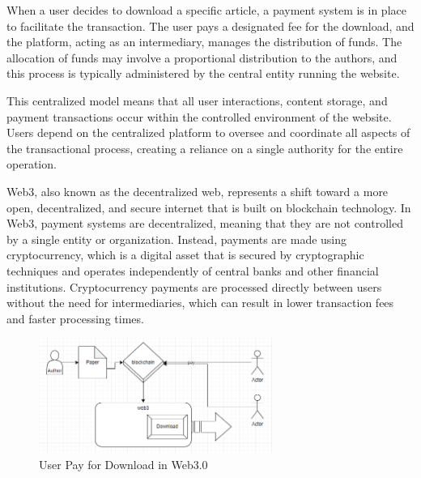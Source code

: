 \documentclass[lettersize,journal]{IEEEtran}
\begin{document}
When a user decides to download a specific article, a payment system is in place to facilitate the transaction. The user pays a designated fee for the download, and the platform, acting as an intermediary, manages the distribution of funds. The allocation of funds may involve a proportional distribution to the authors, and this process is typically administered by the central entity running the website.

This centralized model means that all user interactions, content storage, and payment transactions occur within the controlled environment of the website. Users depend on the centralized platform to oversee and coordinate all aspects of the transactional process, creating a reliance on a single authority for the entire operation.



Web3, also known as the decentralized web, represents a shift toward a more open, decentralized, and secure internet that is built on blockchain technology. In Web3, payment systems are decentralized, meaning that they are not controlled by a single entity or organization. Instead, payments are made using cryptocurrency, which is a digital asset that is secured by cryptographic techniques and operates independently of central banks and other financial institutions. Cryptocurrency payments are processed directly between users without the need for intermediaries, which can result in lower transaction fees and faster processing times.

\begin{figure}[h]
  \centering
  \includegraphics[width=3in]{assets/web3.png}
  \caption{User Pay for Download in Web3.0}
  \label{fig:web3}
\end{figure}
\end{document}
